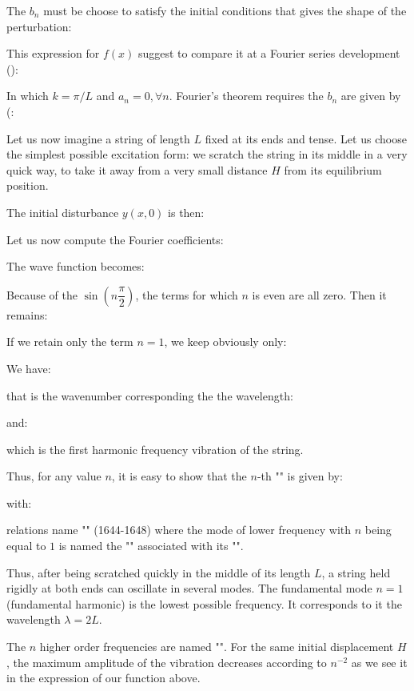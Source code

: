 	The $b_n$ must be choose to satisfy the initial conditions that gives the shape of the perturbation:
	
	This expression for $f(x)$ suggest to compare it at a Fourier series development ():
	
	In which $k=\pi/L$ and $a_n=0,\forall n$. Fourier's theorem requires the $b_n$ are given by (:
	
	Let us now imagine a string of length $L$ fixed at its ends and tense. Let us choose the simplest possible excitation form: we scratch the string in its middle in a very quick way, to take it away from a very small distance $H$ from its equilibrium position.
	
	The initial disturbance $y (x, 0)$ is then:
	
	Let us now compute the Fourier coefficients:
	
	
	The wave function becomes:
	
	Because of the $\sin\left(n\dfrac{\pi}{2}\right)$, the terms for which $n$ is even are all zero. Then it remains:
	
	If we retain only the term $n = 1$, we keep obviously only:
	
	We have:
	
	that is the wavenumber corresponding the the wavelength:
	
	and:
	
	which is the first harmonic frequency vibration of the string.
	
	Thus, for any value $n$, it is easy to show that the $n$-th "" is given by:
	
	with:
	
	relations name "" (1644-1648) where the mode of lower frequency with $n$ being equal to $1$ is named the "" associated with its "".

	Thus, after being scratched quickly in the middle of its length $L$, a string held rigidly at both ends can oscillate in several modes. The fundamental mode $n=1$ (fundamental harmonic) is the lowest possible frequency. It corresponds to it the wavelength $\lambda=2L$.

	The $n$ higher order frequencies are named "". For the same initial displacement $H$, the maximum amplitude of the vibration decreases according to $n^{-2}$ as we see it in the expression of our function above.

